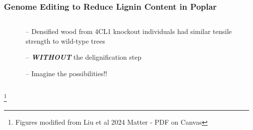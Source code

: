 \documentclass[xcolor=dvipsnames]{beamer}
\newcommand\blfootnote[1]{%
	\begingroup
	\renewcommand\thefootnote{}\footnote{#1}%
	\addtocounter{footnote}{-1}%
	\endgroup
}
\begin{document}
\begin{frame}
	\frametitle{Genome Editing to Reduce Lignin Content in Poplar}
	
	
	\begin{columns}
		\begin{column}{0.5\textwidth}
		\end{column}
		\begin{column}{0.5\textwidth}
			\begin{itemize}
				\item[--] Densified wood from 4CL1 knockout individuals had similar tensile strength to wild-type trees\\	
				\item[--] \textbf{\textit{WITHOUT}} the delignification step
				\vspace{10pt}
				\item[--] Imagine the possibilities!!

			\end{itemize}
			

		\end{column}
	\end{columns}
	
	
	\blfootnote{Figures modified from Liu et al 2024 Matter - PDF on Canvas}
\end{frame}
\end{document}
